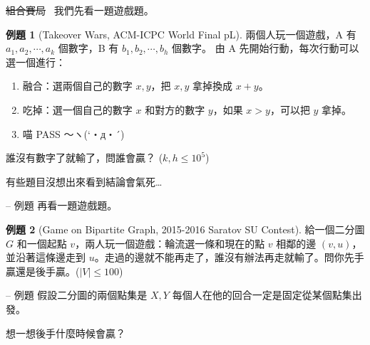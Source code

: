 \documentclass[notheorems,xcolor=dvipsnames]{beamer}
\newcommand\abs[1]{\left\lvert #1 \right\rvert}
\theoremstyle{definition}
\newtheorem{problem}{例題}
\begin{document}
\begin{frame}{\sout{組合賽局}~{\secname}}
  我們先看一題遊戲題。
  \begin{problem}[Takeover Wars, ACM-ICPC World Final pL]
    \small
    兩個人玩一個遊戲，A 有 $a_1, a_2, \cdots, a_k$ 個數字，B 有 $b_1, b_2, \cdots, b_h$ 個數字。
    由 A 先開始行動，每次行動可以選一個進行：
    \begin{enumerate}
      \item 融合：選兩個自己的數字 $x, y$，把 $x, y$ 拿掉換成 $x+y$。
      \item 吃掉：選一個自己的數字 $x$ 和對方的數字 $y$，如果 $x > y$，可以把 $y$ 拿掉。
      \item {\SHSTW 喵 PASS ～ヽ(`・д・´)}
    \end{enumerate}
    誰沒有數字了就輸了，問誰會贏？ ($k, h \leq 10^5$)
  \end{problem} \pause

  有些題目沒想出來看到結論會氣死…
\end{frame}

\begin{frame}{{\secname} -- 例題}
  再看一題遊戲題。\pause

  \begin{problem}[Game on Bipartite Graph, {\small 2015-2016 Saratov SU Contest}]
  給一個二分圖 $G$ 和一個起點 $v$，兩人玩一個遊戲：輪流選一條和現在的點 $v$ 相鄰的邊 $(v, u)$，
  並沿著這條邊走到 $u$。走過的邊就不能再走了，誰沒有辦法再走就輸了。問你先手贏還是後手贏。($\abs{V} \leq 100$)
  \end{problem}
\end{frame}

\begin{frame}{{\secname} -- 例題}
  假設二分圖的兩個點集是 $X, Y$ 每個人在他的回合一定是固定從某個點集出發。\pause

  \medskip
  想一想後手什麼時候會贏？

  \medskip
  \begin{figure}
    \centering
  \end{figure}
\end{frame}
\end{document}
